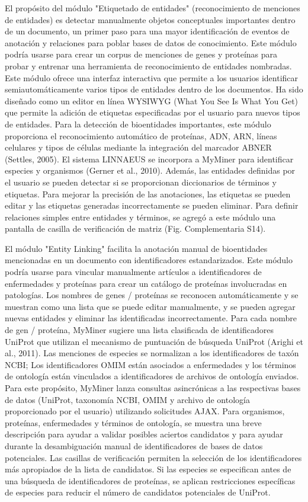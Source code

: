 \begin{description}
El propósito del módulo "Etiquetado de entidades" (reconocimiento de menciones de entidades) es detectar manualmente objetos conceptuales importantes dentro de un documento, un primer paso para una mayor identificación de eventos de anotación y relaciones para poblar bases de datos de conocimiento. Este módulo podría usarse para crear un corpus de menciones de genes y proteínas para probar y entrenar una herramienta de reconocimiento de entidades nombradas. Este módulo ofrece una interfaz interactiva que permite a los usuarios identificar semiautomáticamente varios tipos de entidades dentro de los documentos. Ha sido diseñado como un editor en línea WYSIWYG (What You See Is What You Get) que permite la adición de etiquetas especificadas por el usuario para nuevos tipos de entidades. Para la detección de bioentidades importantes, este módulo proporciona el reconocimiento automático de proteínas, ADN, ARN, líneas celulares y tipos de células mediante la integración del marcador ABNER (Settles, 2005). El sistema LINNAEUS se incorpora a MyMiner para identificar especies y organismos (Gerner et al., 2010). Además, las entidades definidas por el usuario se pueden detectar si se proporcionan diccionarios de términos y etiquetas. Para mejorar la precisión de las anotaciones, las etiquetas se pueden editar y las etiquetas generadas incorrectamente se pueden eliminar. Para definir relaciones simples entre entidades y términos, se agregó a este módulo una pantalla de casilla de verificación de matriz (Fig. Complementaria S14).

El módulo "Entity Linking" facilita la anotación manual de bioentidades mencionadas en un documento con identificadores estandarizados. Este módulo podría usarse para vincular manualmente artículos a identificadores de enfermedades y proteínas para crear un catálogo de proteínas involucradas en patologías. Los nombres de genes / proteínas se reconocen automáticamente y se muestran como una lista que se puede editar manualmente, y se pueden agregar nuevas entidades y eliminar las identificadas incorrectamente. Para cada nombre de gen / proteína, MyMiner sugiere una lista clasificada de identificadores UniProt que utilizan el mecanismo de puntuación de búsqueda UniProt (Arighi et al., 2011). Las menciones de especies se normalizan a los identificadores de taxón NCBI; Los identificadores OMIM están asociados a enfermedades y los términos de ontología están vinculados a identificadores de archivos de ontología enviados. Para este propósito, MyMiner lanza consultas asincrónicas a las respectivas bases de datos (UniProt, taxonomía NCBI, OMIM y archivo de ontología proporcionado por el usuario) utilizando solicitudes AJAX. Para organismos, proteínas, enfermedades y términos de ontología, se muestra una breve descripción para ayudar a validar posibles aciertos candidatos y para ayudar durante la desambiguación manual de identificadores de bases de datos potenciales. Las casillas de verificación permiten la selección de los identificadores más apropiados de la lista de candidatos. Si las especies se especifican antes de una búsqueda de identificadores de proteínas, se aplican restricciones específicas de especies para reducir el número de candidatos potenciales de UniProt.


\end{description}
